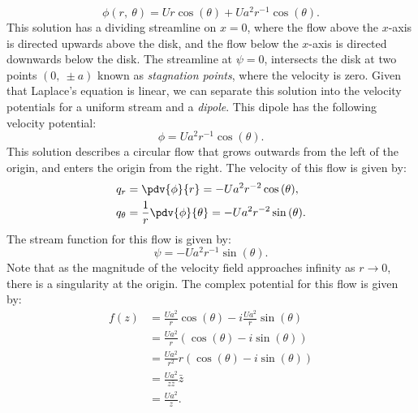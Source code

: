 \documentclass{article}
\theoremstyle{definition}
\begin{document}
\begin{equation*}
    \phi\left( r,\: \theta \right) = U r \cos{\left( \theta \right)} + U a^2 r^{-1} \cos{\left( \theta \right)}.
\end{equation*}
This solution has a dividing streamline on \(x = 0\), where the flow
above the \(x\)-axis is directed upwards above the disk, and the flow
below the \(x\)-axis is directed downwards below the disk. The
streamline at \(\psi = 0\), intersects the disk at two points
\(\left( 0,\: \pm a \right)\) known as \textit{stagnation points}, where
the velocity is zero.
Given that Laplace's equation is linear, we can separate this solution
into the velocity potentials for a uniform stream and a \textit{dipole}.
This dipole has the following velocity potential:
\begin{equation*}
    \phi = U a^2 r^{-1} \cos{\left( \theta \right)}.
\end{equation*}
This solution describes a circular flow that grows outwards from the
left of the origin, and enters the origin from the right. The velocity
of this flow is given by:
\begin{align*}
    q_r        & = \pdv{\phi}{r} = -U a^2 r^{-2} \cos{\left( \theta \right)},                  \\
    q_{\theta} & = \frac{1}{r} \pdv{\phi}{\theta} = -U a^2 r^{-2} \sin{\left( \theta \right)}.
\end{align*}
The stream function for this flow is given by:
\begin{equation*}
    \psi = -U a^2 r^{-1} \sin{\left( \theta \right)}.
\end{equation*}
Note that as the magnitude of the velocity field approaches infinity as
\(r \to 0\), there is a singularity at the origin. The complex potential
for this flow is given by:
\begin{align*}
    f\left( z \right) & = \frac{U a^2}{r} \cos{\left( \theta \right)} - i \frac{U a^2}{r} \sin{\left( \theta \right)}    \\
                      & = \frac{U a^2}{r} \left( \cos{\left( \theta \right)} - i \sin{\left( \theta \right)} \right)     \\
                      & = \frac{U a^2}{r^2} r \left( \cos{\left( \theta \right)} - i \sin{\left( \theta \right)} \right) \\
                      & = \frac{U a^2}{z \bar{z}} \bar{z}                                                                \\
                      & = \frac{U a^2}{z}.
\end{align*}
\end{document}
